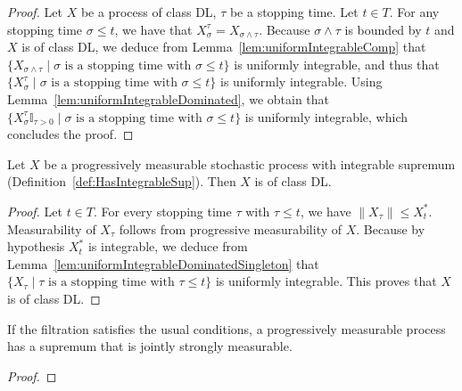 \begin{proof}\leanok
Let $X$ be a process of class DL, $\tau$ be a stopping time. Let $t \in T$. For any stopping time $\sigma \le t$, we have that $X_\sigma^\tau = X_{\sigma \land \tau}$. Because $\sigma \land \tau$ is bounded by $t$ and $X$ is of class DL, we deduce from Lemma~\ref{lem:uniformIntegrableComp} that $\{X_{\sigma \land \tau} \mid \sigma \text{ is a stopping time with } \sigma \le t\}$ is uniformly integrable, and thus that $\{X^\tau_\sigma \mid \sigma \text{ is a stopping time with } \sigma \le t\}$ is uniformly integrable. Using Lemma~\ref{lem:uniformIntegrableDominated}, we obtain that $\{X^\tau_\sigma \mathbb{I}_{\tau > 0} \mid \sigma \text{ is a stopping time with } \sigma \le t\}$ is uniformly integrable, which concludes the proof.
\end{proof}


\begin{lemma}\label{lem:Integrable.classDL}
  \leanok
Let $X$ be a progressively measurable stochastic process with integrable supremum (Definition~\ref{def:HasIntegrableSup}). Then $X$ is of class DL.
\end{lemma}

\begin{proof}\leanok
Let $t \in T$. For every stopping time $\tau$ with $\tau \le t$, we have $\|X_\tau\| \le X^*_t$.
Measurability of $X_\tau$ follows from progressive measurability of $X$.
Because by hypothesis $X^*_t$ is integrable, we deduce from Lemma~\ref{lem:uniformIntegrableDominatedSingleton} that $\{X_\tau \mid \tau \text{ is a stopping time with } \tau \le t\}$ is uniformly integrable.
This proves that $X$ is of class DL.
\end{proof}


\begin{lemma}\label{lem:ProgMeasurable.hasStronglyMeasurableSup}
  \leanok
  If the filtration satisfies the usual conditions, a progressively measurable process has a supremum that is jointly strongly measurable.
\end{lemma}

\begin{proof}\leanok

\end{proof}

